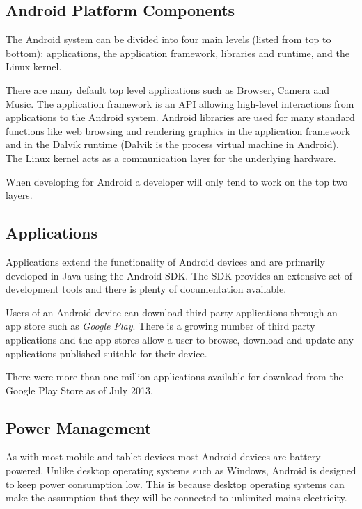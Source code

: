 \documentclass{report}
\begin{document}
\subsection{Android Platform Components}

The Android system can be divided into four main levels (listed from top to bottom): applications, the application framework, libraries and runtime, and the Linux kernel.

There are many default top level applications such as Browser, Camera and Music. The application framework is an API allowing high-level interactions from applications to the Android system. Android libraries are used for many standard functions like web browsing and rendering graphics in the application framework and in the Dalvik runtime (Dalvik is the process virtual machine in Android). The Linux kernel acts as a communication layer for the underlying hardware.

When developing for Android a developer will only tend to work on the top two layers.

\subsection{Applications}

Applications extend the functionality of Android devices and are primarily developed in Java using the Android SDK. The SDK provides an extensive set of development tools and there is plenty of documentation available.

Users of an Android device can download third party applications through an app store such as \emph{Google Play}. There is a growing number of third party applications and the app stores allow a user to browse, download and update any applications published suitable for their device.

There were more than one million applications available for download from the Google Play Store as of July 2013\cite{appstoredownloads}. 

\subsection{Power Management}

As with most mobile and tablet devices most Android devices are battery powered. Unlike desktop operating systems such as Windows, Android is designed to keep power consumption low. This is because desktop operating systems can make the assumption that they will be connected to unlimited mains electricity. 
\end{document}
